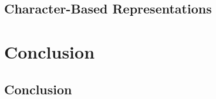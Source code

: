 \documentclass[12pt,parskip]{scrbook}
\begin{document}
\chapter{Character-Based Representations}\label{sec:character-based-representations}

\part{Conclusion}\label{part:conclusion}
\chapter{Conclusion}\label{sec:conclusion}





%
%
\end{document}

